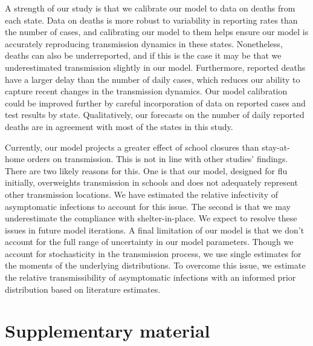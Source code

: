 \documentclass[11pt]{article}
\begin{document}
A strength of our study is that we calibrate our model to data on deaths from each state. Data on deaths is more robust to variability in reporting rates than the number of cases, and calibrating our model to them helps ensure our model is accurately reproducing transmission dynamics in these states. Nonetheless, deaths can also be underreported, and if this is the case it may be that we underestimated transmission slightly in our model. Furthermore, reported deaths have a larger delay than the number of daily cases, which reduces our ability to capture recent changes in the transmission dynamics. Our model calibration could be improved further by careful incorporation of data on reported cases and test results by state. Qualitatively, our forecasts on the number of daily reported deaths are in agreement with most of the states in this study.

Currently, our model projects a greater effect of school closures than stay-at-home orders on transmission. This is not in line with other studies’ findings. There are two likely reasons for this. One is that our model, designed for flu initially, overweights transmission in schools and does not adequately represent other transmission locations. We have estimated the relative infectivity of asymptomatic infections to account for this issue. The second is that we may underestimate the compliance with shelter-in-place. We expect to resolve these issues in future model iterations. A final limitation of our model is that we don’t account for the full range of uncertainty in our model parameters. Though we account for stochasticity in the transmission process, we use single estimates for the moments of the underlying distributions. To overcome this issue, we estimate the relative transmissibility of asymptomatic infections with an informed prior distribution based on literature estimates. 

\clearpage
\printbibliography


\section*{Supplementary material}
\setcounter{table}{0}
\renewcommand{\thetable}{S\arabic{table}}%
\setcounter{figure}{0}
\renewcommand{\thefigure}{S\arabic{figure}}%
\end{document}
